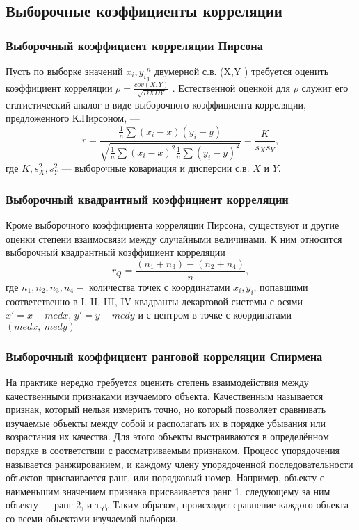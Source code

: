\documentclass[12pt]{article}
\begin{document}
	\subsection{Выборочные коэффициенты корреляции}
	\subsubsection{Выборочный коэффициент корреляции Пирсона}
	Пусть по выборке значений ${x_{i},y_{i}}^{n}_{1}$ двумерной с.в. (X,Y ) требуется оценить коэффициент корреляции $\rho = \frac{cov(X,Y)}{\sqrt{DXDY}}$ . Естественной оценкой для $\rho$ служит его статистический аналог в виде выборочного коэффициента корреляции, предложенного К.Пирсоном, —
	\begin{equation}
		r = \frac{
			\frac{1}{n}\sum{(x_{i} - \bar{x})(y_{i}-\bar{y})}
		}{
			\sqrt{\frac{1}{n}\sum{(x_{i} - \bar{x})^{2}}\frac{1}{n}\sum{(y_{i} - \bar{y})^{2}}}
		}=\frac{K}{s_{X}s_{Y}},
		\label{r}
	\end{equation}
	где $K,s^{2}_{X},s^{2}_{Y}$ — выборочные ковариация и дисперсии с.в. $X$ и $Y$.
	
	
	\subsubsection{Выборочный квадрантный коэффициент корреляции}
	Кроме выборочного коэффициента корреляции Пирсона, существуют и другие оценки степени взаимосвязи между случайными величинами. К ним относится выборочный квадрантный коэффициент корреляции
	\begin{equation}
		r_{Q} = \frac{(n_{1} + n_{3}) - (n_{2} + n_{4})}{n},
		\label{rQ}
	\end{equation}
	где $n_1, n_2, n_3, n_4 - $ количества точек с координатами $x_i, y_i$, попавшими соответственно в I, II, III, IV квадранты декартовой системы с осями $x'=x-med x$, $y'=y-med y$ и с центром в точке с координатами $(med x,~med y)$
	
	
	
	\subsubsection{Выборочный коэффициент ранговой корреляции Спирмена}
	На практике нередко требуется оценить степень взаимодействия между качественными признаками изучаемого объекта. Качественным называется признак, который нельзя измерить точно, но который позволяет сравнивать изучаемые объекты между собой и располагать их в порядке убывания или возрастания их качества. Для этого объекты выстраиваются в определённом порядке в соответствии с рассматриваемым признаком. Процесс упорядочения называется ранжированием, и каждому члену упорядоченной последовательности объектов присваивается ранг, или порядковый номер. Например, объекту с наименьшим значением признака присваивается ранг 1, следующему за ним объекту — ранг 2, и т.д. Таким образом, происходит сравнение каждого объекта со всеми объектами изучаемой выборки.
\end{document}

